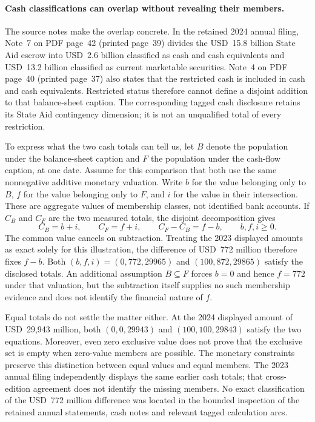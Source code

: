 \paragraph{Cash classifications can overlap without revealing their members.}
The source notes make the overlap concrete. In the retained 2024 annual filing,
Note~7 on PDF page~42 (printed page~39) divides the USD~15.8 billion State Aid
escrow into USD~2.6 billion classified as cash and cash equivalents and
USD~13.2 billion classified as current marketable securities. Note~4 on PDF
page~40 (printed page~37) also states that the restricted cash is included in
cash and cash equivalents. Restricted status therefore cannot define a
disjoint addition to that balance-sheet caption. The corresponding tagged
cash disclosure retains its State Aid contingency dimension; it is not an
unqualified total of every restriction.

To express what the two cash totals can tell us, let $B$ denote the population
under the balance-sheet caption and $F$ the population under the cash-flow
caption, at one date. Assume for this comparison that both use the same
nonnegative additive monetary valuation. Write $b$ for the value belonging
only to $B$, $f$ for the value belonging only to $F$, and $i$ for the value in
their intersection. These are aggregate values of membership classes, not
identified bank accounts. If $C_B$ and $C_F$ are the two measured totals, the
disjoint decomposition gives
\[
 C_B=b+i,\qquad C_F=f+i,\qquad C_F-C_B=f-b,
 \qquad b,f,i\geq0.
\]
The common value cancels on subtraction. Treating the 2023 displayed amounts
as exact solely for this illustration, the difference of USD~772 million
therefore fixes $f-b$. Both $(b,f,i)=(0,772,29965)$ and
$(100,872,29865)$ satisfy the disclosed totals. An additional assumption
$B\subseteq F$ forces $b=0$ and hence $f=772$ under that valuation, but the
subtraction itself supplies no such membership evidence and does not identify
the financial nature of $f$.

Equal totals do not settle the matter either. At the 2024 displayed amount
of USD~29,943 million, both $(0,0,29943)$ and $(100,100,29843)$ satisfy the
two equations. Moreover, even zero exclusive value does not prove that the
exclusive set is empty when zero-value members are possible. The monetary
constraints preserve this distinction between equal values and equal members.
The 2023 annual filing independently displays the same earlier cash totals;
that cross-edition agreement does not identify the missing members. No exact
classification of the USD~772 million difference was located in the bounded
inspection of the retained annual statements, cash notes and relevant tagged
calculation arcs.

